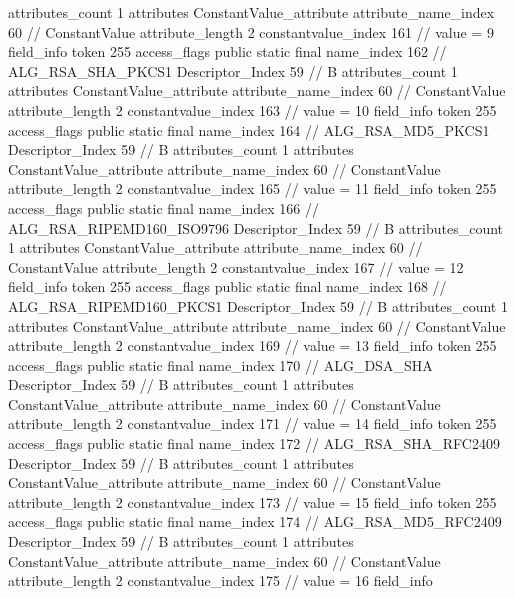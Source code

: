 {{{{{				attributes_count	1
				attributes {
				ConstantValue_attribute {
					attribute_name_index	60		// ConstantValue
					attribute_length	2
					constantvalue_index	161		// value = 9
				}
				}
			}
			field_info {
				token	255
				access_flags	public static final
				name_index	162		// ALG_RSA_SHA_PKCS1
				Descriptor_Index	59		// B
				attributes_count	1
				attributes {
				ConstantValue_attribute {
					attribute_name_index	60		// ConstantValue
					attribute_length	2
					constantvalue_index	163		// value = 10
				}
				}
			}
			field_info {
				token	255
				access_flags	public static final
				name_index	164		// ALG_RSA_MD5_PKCS1
				Descriptor_Index	59		// B
				attributes_count	1
				attributes {
				ConstantValue_attribute {
					attribute_name_index	60		// ConstantValue
					attribute_length	2
					constantvalue_index	165		// value = 11
				}
				}
			}
			field_info {
				token	255
				access_flags	public static final
				name_index	166		// ALG_RSA_RIPEMD160_ISO9796
				Descriptor_Index	59		// B
				attributes_count	1
				attributes {
				ConstantValue_attribute {
					attribute_name_index	60		// ConstantValue
					attribute_length	2
					constantvalue_index	167		// value = 12
				}
				}
			}
			field_info {
				token	255
				access_flags	public static final
				name_index	168		// ALG_RSA_RIPEMD160_PKCS1
				Descriptor_Index	59		// B
				attributes_count	1
				attributes {
				ConstantValue_attribute {
					attribute_name_index	60		// ConstantValue
					attribute_length	2
					constantvalue_index	169		// value = 13
				}
				}
			}
			field_info {
				token	255
				access_flags	public static final
				name_index	170		// ALG_DSA_SHA
				Descriptor_Index	59		// B
				attributes_count	1
				attributes {
				ConstantValue_attribute {
					attribute_name_index	60		// ConstantValue
					attribute_length	2
					constantvalue_index	171		// value = 14
				}
				}
			}
			field_info {
				token	255
				access_flags	public static final
				name_index	172		// ALG_RSA_SHA_RFC2409
				Descriptor_Index	59		// B
				attributes_count	1
				attributes {
				ConstantValue_attribute {
					attribute_name_index	60		// ConstantValue
					attribute_length	2
					constantvalue_index	173		// value = 15
				}
				}
			}
			field_info {
				token	255
				access_flags	public static final
				name_index	174		// ALG_RSA_MD5_RFC2409
				Descriptor_Index	59		// B
				attributes_count	1
				attributes {
				ConstantValue_attribute {
					attribute_name_index	60		// ConstantValue
					attribute_length	2
					constantvalue_index	175		// value = 16
				}
				}
			}
			field_info {
}}}}}
